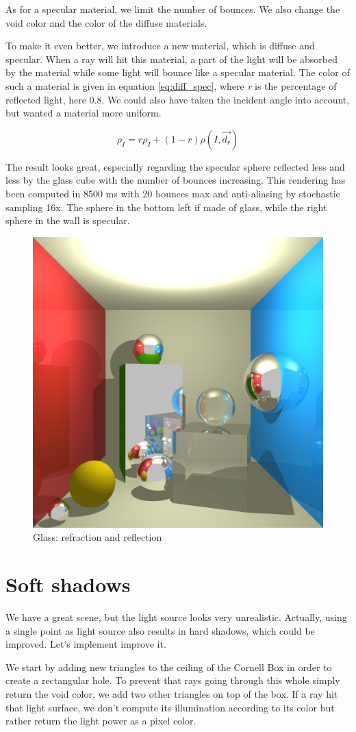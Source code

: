 As for a specular material, we limit the number of bounces. We also change the void color and the color of the diffuse materials.

To make it even better, we introduce a new material, which is diffuse and specular. When a ray will hit this material, a part of the light will be absorbed by the material while some light will bounce like a specular material. The color of such a material is given in equation \ref{eq:diff_spec}, where \textit{r} is the percentage of reflected light, here 0.8. We could also have taken the incident angle into account, but wanted a material more uniform.

\begin{equation}
\rho_I = r \rho_I + (1 - r) \rho(I, \vec{d_r})
\label{eq:diff_spec}
\end{equation}

The result looks great, especially regarding the specular sphere reflected less and less by the glass cube with the number of bounces increasing. This rendering has been computed in 8500 ms with 20 bounces max and anti-aliasing by stochastic sampling 16x. The sphere in the bottom left if made of glass, while the right sphere in the wall is specular.

\begin{figure}[H]
\centering
\includegraphics[width=0.35\linewidth]{img/glass_awesome.png}
\caption{Glass: refraction and reflection}
\end{figure}


\section{Soft shadows}
We have a great scene, but the light source looks very unrealistic. Actually, using a single point as light source also results in hard shadows, which could be improved. Let's implement improve it.

We start by adding new triangles to the ceiling of the Cornell Box in order to create a rectangular hole. To prevent that rays going through this whole simply return the void color, we add two other triangles on top of the box. If a ray hit that light surface, we don't compute its illumination according to its color but rather return the light power as a pixel color.

